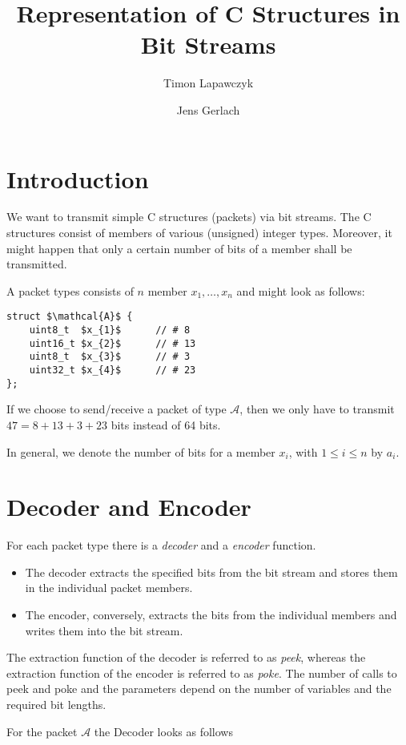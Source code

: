 \documentclass[parskip=half,paper=a4,DIV=13]{scrartcl}
\title{Representation of C Structures in Bit Streams}
\author{Timon Lapawczyk \and Jens Gerlach}
\begin{document}
\maketitle

\section{Introduction}

We want to transmit simple C structures (packets) via bit streams.
The C structures consist of members of various (unsigned) integer types.
Moreover, it might happen that only a certain number of bits of a member
shall be transmitted. 

A packet types consists of $n$ member $x_1,\ldots, x_n$ and might look as follows:

\begin{lstlisting}[mathescape]
struct $\mathcal{A}$ {
	uint8_t  $x_{1}$      // # 8
	uint16_t $x_{2}$      // # 13
	uint8_t  $x_{3}$      // # 3
	uint32_t $x_{4}$      // # 23
};
\end{lstlisting}

If we choose to send\slash receive a packet of type $\mathcal{A}$, then
we only have to transmit $47 = 8 + 13 + 3 + 23$ bits instead of 64 bits.

In general, we denote the number of bits for a member $x_i$, with $1 \leq i \leq n$  by $a_i$.

\section{Decoder and Encoder}

For each packet type there is a \emph{decoder} and a \emph{encoder} function.
\begin{itemize}
\item
The decoder extracts the specified bits from the bit stream and stores them
in the individual packet members.
\item
The encoder, conversely, extracts the bits from the individual members
and writes them into the bit stream.
\end{itemize}

The extraction function of the decoder is referred to as \emph{peek},
whereas the extraction function of the encoder is referred to as \emph{poke}.
The number of calls to peek and poke and the parameters depend on the number
of variables and the required bit lengths.

For the packet $\mathcal{A}$ the Decoder looks as follows
\end{document}
